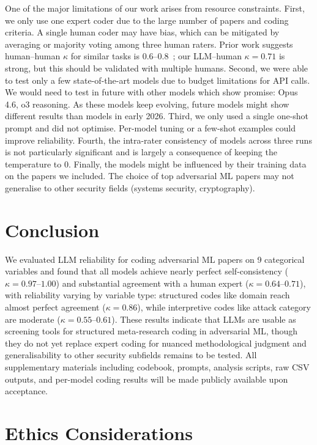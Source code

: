 \documentclass[conference,compsoc]{IEEEtran}
\begin{document}
One of the major limitations of our work arises from resource constraints. First, we only use one expert coder due to the large number of papers and coding criteria. A single human coder may have bias, which can be mitigated by averaging or majority voting among three human raters. Prior work suggests human--human $\kappa$ for similar tasks is 0.6--0.8~\cite{krippendorff2004reliability}; our LLM--human $\kappa = 0.71$ is strong, but this should be validated with multiple humans. Second, we were able to test only a few state-of-the-art models due to budget limitations for API calls. We would need to test in future with other models which show promise: Opus 4.6, o3 reasoning. As these models keep evolving, future models might show different results than models in early 2026. Third, we only used a single one-shot prompt and did not optimise. Per-model tuning or a few-shot examples could improve reliability. Fourth, the intra-rater consistency of models across three runs is not particularly significant and is largely a consequence of keeping the temperature to 0. Finally, the models might be influenced by their training data on the papers we included. The choice of top adversarial ML papers may not generalise to other security fields (systems security, cryptography).

\section{Conclusion}

We evaluated LLM reliability for coding adversarial ML papers on 9 categorical variables and found that all models achieve nearly perfect self-consistency ($\kappa = 0.97$--$1.00$) and substantial agreement with a human expert ($\kappa = 0.64$--$0.71$), with reliability varying by variable type: structured codes like domain reach almost perfect agreement ($\kappa = 0.86$), while interpretive codes like attack category are moderate ($\kappa = 0.55$--$0.61$). These results indicate that LLMs are usable as screening tools for structured meta-research coding in adversarial ML, though they do not yet replace expert coding for nuanced methodological judgment and generalisability to other security subfields remains to be tested. All supplementary materials including codebook, prompts, analysis scripts, raw CSV outputs, and per-model coding results will be made publicly available upon acceptance.

\section{Ethics Considerations}
\end{document}
